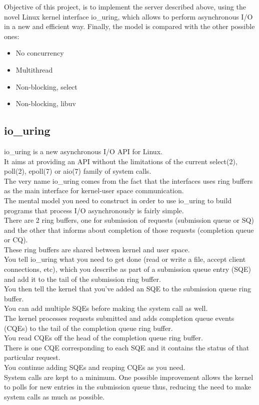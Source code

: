 Objective of this project, is to implement the server described above, using the novel Linux kernel interface io\_uring, which allows to perform asynchronous I/O in a new and efficient way.
Finally, the model is compared with the other possible ones: 

\begin{itemize}
    \item No concurrency
    \item Multithread
    \item Non-blocking, select
    \item Non-blocking, libuv
\end{itemize}


\subsection{io\_uring}
io\_uring is a new asynchronous I/O API for Linux.\\
It aims at providing an API without the limitations of the current select(2), poll(2), epoll(7) or aio(7) family of system calls. \\
The very name io\_uring comes from the fact that the interfaces uses ring buffers as the main interface for kernel-user space communication. \\
The mental model you need to construct in order to use io\_uring to build programs that process I/O asynchronously is fairly simple.\\
There are 2 ring buffers, one for submission of requests (submission queue or SQ) and the other that informs about completion of those requests (completion queue or CQ).\\
These ring buffers are shared between kernel and user space.\\
You tell io\_uring what you need to get done (read or write a file, accept client connections, etc), which you describe as part of a submission queue entry (SQE) and add it to the tail of the submission ring buffer.\\
You then tell the kernel that you’ve added an SQE to the submission queue ring buffer. \\
You can add multiple SQEs before making the system call as well.\\
The kernel processes requests submitted and adds completion queue events (CQEs) to the tail of the completion queue ring buffer.\\
You read CQEs off the head of the completion queue ring buffer. \\
There is one CQE corresponding to each SQE and it contains the status of that particular request.\\
You continue adding SQEs and reaping CQEs as you need.\\
System calls are kept to a minimum.
One possible improvement allows the kernel to polls for new entries in the submission queue thus, reducing the need to make system calls as much as possible. \\


